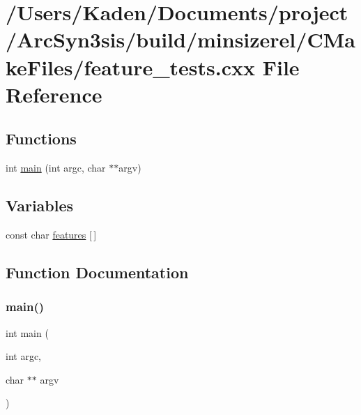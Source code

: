 \hypertarget{a00828}{}\section{/\+Users/\+Kaden/\+Documents/project/\+Arc\+Syn3sis/build/minsizerel/\+C\+Make\+Files/feature\+\_\+tests.cxx File Reference}
\label{a00828}
\subsection*{Functions}
\begin{DoxyCompactItemize}
\item 
int \hyperlink{a00828_a3c04138a5bfe5d72780bb7e82a18e627}{main} (int argc, char $\ast$$\ast$argv)
\end{DoxyCompactItemize}
\subsection*{Variables}
\begin{DoxyCompactItemize}
\item 
const char \hyperlink{a00828_a1582568e32f689337602a16bf8a5bff0}{features} \mbox{[}$\,$\mbox{]}
\end{DoxyCompactItemize}


\subsection{Function Documentation}
\mbox{\label{a00828_a3c04138a5bfe5d72780bb7e82a18e627}} 
\subsubsection{\texorpdfstring{main()}{main()}}
{\footnotesize\ttfamily int main (\begin{DoxyParamCaption}\item[{int}]{argc,  }\item[{char $\ast$$\ast$}]{argv }\end{DoxyParamCaption})}



